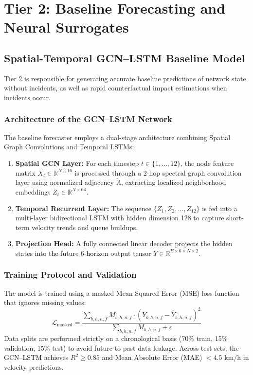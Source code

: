 \chapter{Tier 2: Baseline Forecasting and Neural Surrogates}
\label{chapter:tier2}

\section{Spatial-Temporal GCN--LSTM Baseline Model}
Tier 2 is responsible for generating accurate baseline predictions of network state without incidents, as well as rapid counterfactual impact estimations when incidents occur.

\subsection{Architecture of the GCN--LSTM Network}
The baseline forecaster employs a dual-stage architecture combining Spatial Graph Convolutions and Temporal LSTMs:
\begin{enumerate}[leftmargin=1.5cm, label=\arabic*.]
  \item \textbf{Spatial GCN Layer:} For each timestep $t \in \{1, \dots, 12\}$, the node feature matrix $X_t \in \mathbb{R}^{N \times 16}$ is processed through a 2-hop spectral graph convolution layer using normalized adjacency $\tilde{A}$, extracting localized neighborhood embeddings $Z_t \in \mathbb{R}^{N \times 64}$.
  \item \textbf{Temporal Recurrent Layer:} The sequence $\{Z_1, Z_2, \dots, Z_{12}\}$ is fed into a multi-layer bidirectional LSTM with hidden dimension 128 to capture short-term velocity trends and queue buildups.
  \item \textbf{Projection Head:} A fully connected linear decoder projects the hidden states into the future 6-horizon output tensor $Y \in \mathbb{R}^{B \times 6 \times N \times 2}$.
\end{enumerate}

\subsection{Training Protocol and Validation}
The model is trained using a masked Mean Squared Error (MSE) loss function that ignores missing values:
\begin{equation}
  \mathcal{L}_{\text{masked}} = \frac{\sum_{b,h,n,f} M_{b,h,n,f} \cdot (Y_{b,h,n,f} - \hat{Y}_{b,h,n,f})^2}{\sum_{b,h,n,f} M_{b,h,n,f} + \epsilon}
\end{equation}
Data splits are performed strictly on a chronological basis (70\% train, 15\% validation, 15\% test) to avoid future-to-past data leakage. Across test sets, the GCN--LSTM achieves $R^2 \ge 0.85$ and Mean Absolute Error (MAE) $< 4.5\text{ km/h}$ in velocity predictions.

